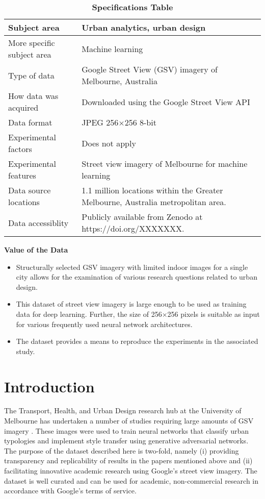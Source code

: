 \documentclass[final,3p,times,authoryear]{elsarticle}
\begin{document}

\begin{table}[!htbp]
\caption{\bf Specifications Table \label{tab:spectable}}     
\begin{tabular}{ |l | l| }
 \hline    
Subject area & Urban analytics, urban design   \\ \hline
More specific subject area & Machine learning  \\ \hline
Type of data & Google Street View (GSV) imagery of Melbourne, Australia  \\ \hline
How data was acquired & Downloaded using the Google Street View API \citep{GoogleMaps2017b}  \\ \hline
Data format & JPEG 256$\times$256 8-bit  \\ \hline
Experimental factors & Does not apply  \\ \hline
Experimental features & Street view imagery of Melbourne for machine learning  \\ \hline
Data source locations & 1.1 million locations within the Greater Melbourne, Australia metropolitan area.  \\ \hline
Data accessiblity & Publicly available from Zenodo at https://doi.org/XXXXXXX.    \\ \hline
\end{tabular}
\end{table}

\textbf{Value of the Data}
\begin{itemize}
\item Structurally selected GSV imagery with limited indoor images for a single city allows for the examination of various research questions related to urban design.
\item This dataset of street view imagery is large enough to be used as training data for deep learning. Further, the size of 256$\times$256 pixels is suitable as input for various frequently used neural network architectures.
\item The dataset provides a means to reproduce the experiments in the associated study.
\end{itemize}

\section{Introduction}
\label{sec:introduction}

The Transport, Health, and Urban Design research hub at the University of Melbourne has undertaken a number of studies \citep[e.g.,][]{nice2018paris, wijnands2018urban} requiring large amounts of GSV imagery \citep{GoogleMaps2017b}. These images were used to train neural networks that classify urban typologies and implement style transfer using generative adversarial networks. The purpose of the dataset described here is two-fold, namely (i) providing transparency and replicability of results in the papers mentioned above and (ii) facilitating innovative academic research using Google's street view imagery. The dataset is well curated and can be used for academic, non-commercial research in accordance with Google's terms of service.
\end{document}
